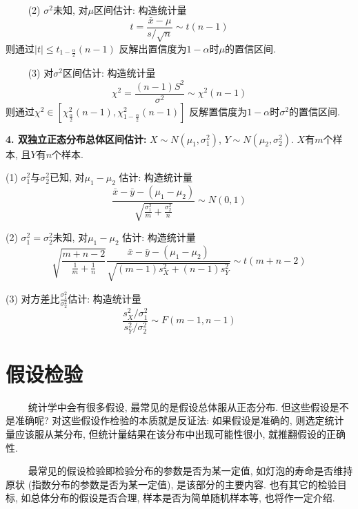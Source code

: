 ~~~~ (2) $\sigma^2$未知, 对$\mu$区间估计: 构造统计量
\begin{equation*}
    t=\frac{\bar{x}-\mu}{s/\sqrt{n}} \sim t(n-1)
\end{equation*}
则通过$|t| \leq t_{1-\frac{\alpha}{2}}(n-1)$ 反解出置信度为$1-\alpha$时$\mu$的置信区间.

~~~~ (3) 对$\sigma^2$区间估计: 构造统计量
\begin{equation*}
    \chi^2=\frac{(n-1)S^2}{\sigma^2} \sim \chi^2(n-1)
\end{equation*}
则通过$\chi^2 \in [\chi^2_{\frac{\alpha}{2}}(n-1),\chi^2_{1-\frac{\alpha}{2}}(n-1)]$ 反解置信度为$1-\alpha$时$\sigma^2$的置信区间.


\textbf{4. 双独立正态分布总体区间估计: }$X\sim N(\mu_1,\sigma_1^2)$, $Y \sim N(\mu_2,\sigma_2^2)$. $X$有$m$个样本, 且$Y$有$n$个样本.

(1) $\sigma_1^2$与$\sigma_2^2$已知, 对$\mu_1-\mu_2$ 估计: 构造统计量
\begin{equation*}
    \frac{\bar{x}-\bar{y}-(\mu_1-\mu_2)}{\sqrt{\frac{\sigma_1^2}{m}+\frac{\sigma_2^2}{n}}} \sim N(0,1)
\end{equation*}

(2) $\sigma_1^2=\sigma_2^2$未知, 对$\mu_1-\mu_2$ 估计: 构造统计量
\begin{equation*}
    \sqrt{\frac{m+n-2}{\frac{1}{m}+\frac{1}{n}}} \frac{\bar{x}-\bar{y}-(\mu_1-\mu_2)}{\sqrt{(m-1)s_X^2+(n-1)s_Y^2}} \sim t(m+n-2)
\end{equation*}

(3) 对方差比$\frac{\sigma_1^2}{\sigma_2^2}$估计: 构造统计量
\begin{equation*}
    \frac{s_X^2/\sigma_1^2}{s_Y^2/\sigma_2^2} \sim F(m-1,n-1)
\end{equation*}

\section{假设检验}

\begin{tcolorbox}[colback=red!5,colframe=red!75!black]
    ~~~~ 统计学中会有很多假设, 最常见的是假设总体服从正态分布. 但这些假设是不是准确呢? 对这些假设作检验的本质就是反证法: 如果假设是准确的, 则选定统计量应该服从某分布, 但统计量结果在该分布中出现可能性很小, 就推翻假设的正确性.

    ~~~~ 最常见的假设检验即检验分布的参数是否为某一定值, 如灯泡的寿命是否维持原状 (指数分布的参数是否为某一定值), 是该部分的主要内容. 也有其它的检验目标, 如总体分布的假设是否合理, 样本是否为简单随机样本等, 也将作一定介绍. 
\end{tcolorbox}

